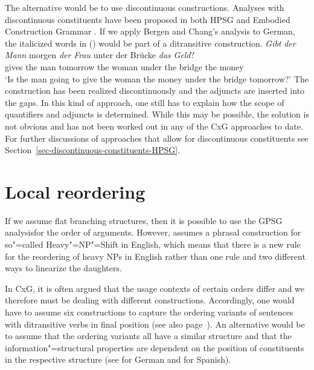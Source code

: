 The alternative would be to use discontinuous constructions. Analyses with discontinuous constituents have been proposed in both 
HPSG \citep{Reape94a} and Embodied Construction Grammar \citep{BC2005a}. If we apply Bergen and Chang's analysis to German,
the italicized words in () would be part of a ditransitive construction.
\ea
\gll \emph{Gibt} \emph{der} \emph{Mann} morgen \emph{der} \emph{Frau} unter der Brücke \emph{das} \emph{Geld}?\\
	 gives the man tomorrow the woman under the bridge the money\\
\glt `Is the man going to give the woman the money under the bridge tomorrow?'
\z
The construction has been realized discontinuously and the adjuncts are inserted into the gaps.
In this kind of approach, one still has to explain how the scope of quantifiers and adjuncts is determined.
While this may be possible, the solution is not obvious and has not been worked out in any of the
CxG approaches to date. For further discussions of approaches that allow for discontinuous constituents see Section~\ref{sec-discontinuous-constituents-HPSG}.

\section{Local reordering}

If we assume flat branching structures, then it is possible to use the GPSG analysis\indexgpsg for the order of arguments.
However, \citet{Kay2002a} assumes a phrasal construction for so"=called Heavy"=NP"=Shift in English, which means that there is a new rule for
the reordering of heavy NPs in English rather than one rule and two different ways to linearize the daughters.

In CxG, it is often argued that the usage contexts of certain orders differ and we therefore must be dealing with different constructions.
Accordingly, one would have to assume six constructions to capture the ordering variants of
sentences with ditransitive verbs in final position (see also page~\pageref{Regeln-PSG-Abfolge}). An alternative would be to assume that the ordering
variants all have a similar structure and that the information"=structural properties are dependent
on the position of constituents in the respective structure (see \citealp{deKuthy2000a} for German and \citealp{Bildhauer2008a}
for Spanish).

